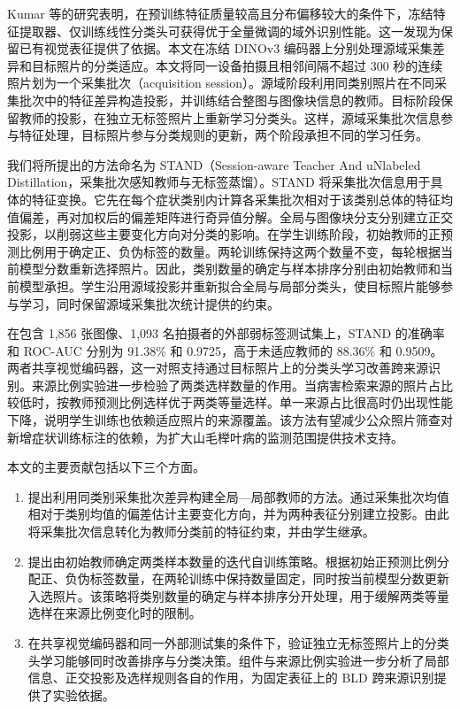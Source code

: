 \documentclass[11pt,a4paper,UTF8,fontset=windows,scheme=plain]{ctexart}
\begin{document}
Kumar 等\cite{kumar2022}的研究表明，在预训练特征质量较高且分布偏移较大的条件下，冻结特征提取器、仅训练线性分类头可获得优于全量微调的域外识别性能。这一发现为保留已有视觉表征提供了依据。本文在冻结 DINOv3 编码器\cite{simeoni2026}上分别处理源域采集差异和目标照片的分类适应。本文将同一设备拍摄且相邻间隔不超过 300 秒的连续照片划为一个采集批次（acquisition session）。源域阶段利用同类别照片在不同采集批次中的特征差异构造投影，并训练结合整图与图像块信息的教师。目标阶段保留教师的投影，在独立无标签照片上重新学习分类头。这样，源域采集批次信息参与特征处理，目标照片参与分类规则的更新，两个阶段承担不同的学习任务。

我们将所提出的方法命名为 STAND（Session-aware Teacher And uNlabeled Distillation，采集批次感知教师与无标签蒸馏）。STAND 将采集批次信息用于具体的特征变换。它先在每个症状类别内计算各采集批次相对于该类别总体的特征均值偏差，再对加权后的偏差矩阵进行奇异值分解。全局与图像块分支分别建立正交投影，以削弱这些主要变化方向对分类的影响。在学生训练阶段，初始教师的正预测比例用于确定正、负伪标签的数量。两轮训练保持这两个数量不变，每轮根据当前模型分数重新选择照片。因此，类别数量的确定与样本排序分别由初始教师和当前模型承担。学生沿用源域投影并重新拟合全局与局部分类头，使目标照片能够参与学习，同时保留源域采集批次统计提供的约束。

在包含 1,856 张图像、1,093 名拍摄者的外部弱标签测试集上，STAND 的准确率和 ROC-AUC 分别为 91.38\% 和 0.9725，高于未适应教师的 88.36\% 和 0.9509。两者共享视觉编码器，这一对照支持通过目标照片上的分类头学习改善跨来源识别。来源比例实验进一步检验了两类选样数量的作用。当病害检索来源的照片占比较低时，按教师预测比例选样优于两类等量选样。单一来源占比很高时仍出现性能下降，说明学生训练也依赖适应照片的来源覆盖。该方法有望减少公众照片筛查对新增症状训练标注的依赖，为扩大山毛榉叶病的监测范围提供技术支持。

本文的主要贡献包括以下三个方面。
\begin{enumerate}
\item 提出利用同类别采集批次差异构建全局—局部教师的方法。通过采集批次均值相对于类别均值的偏差估计主要变化方向，并为两种表征分别建立投影。由此将采集批次信息转化为教师分类前的特征约束，并由学生继承。
\item 提出由初始教师确定两类样本数量的迭代自训练策略。根据初始正预测比例分配正、负伪标签数量，在两轮训练中保持数量固定，同时按当前模型分数更新入选照片。该策略将类别数量的确定与样本排序分开处理，用于缓解两类等量选样在来源比例变化时的限制。
\item 在共享视觉编码器和同一外部测试集的条件下，验证独立无标签照片上的分类头学习能够同时改善排序与分类决策。组件与来源比例实验进一步分析了局部信息、正交投影及选样规则各自的作用，为固定表征上的 BLD 跨来源识别提供了实验依据。
\end{enumerate}
\end{document}
